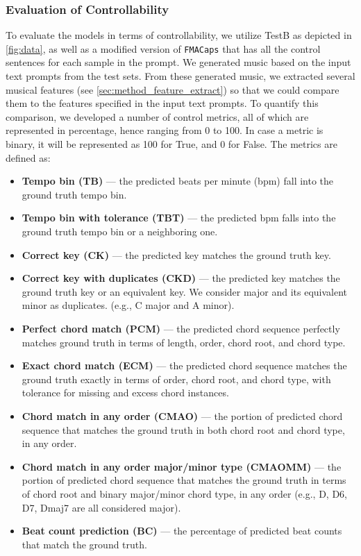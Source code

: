 \documentclass[11pt]{article}
\newcommand{\datasetFMA}{\texttt{FMACaps}}
\begin{document}
\subsubsection{Evaluation of Controllability}
\label{sec:ctrl_eval}
To evaluate the models in terms of controllability, we utilize TestB as depicted in \cref{fig:data}, as well as a modified version of \datasetFMA{} that has all the control sentences for each sample in the prompt. We generated music based on the input text prompts from the test sets. From these generated music, we extracted several musical features (see \cref{sec:method_feature_extract}) so that we could compare them to the features specified in the input text prompts. To quantify this comparison, we developed a number of control metrics, all of which are represented in percentage, hence ranging from 0 to 100. In case a metric is binary, it will be represented as 100 for True, and 0 for False. The metrics are defined as: \begin{itemize}[itemsep=0pt, leftmargin=*, wide, labelwidth=0pt, labelindent=0pt, parsep=0pt]
    \item \textbf{Tempo bin (TB)} --- the predicted beats per minute (bpm) fall into the ground truth tempo bin.
    \item \textbf{Tempo bin with tolerance (TBT)} --- the predicted bpm falls into the ground truth tempo bin or a neighboring one.
    \item \textbf{Correct key (CK)} --- the predicted key matches the ground truth key. 
    \item \textbf{Correct key with duplicates (CKD)} --- the predicted key matches the ground truth key or an equivalent key. We consider major and its equivalent minor as duplicates.  (e.g., C major and A minor). 
    \item \textbf{Perfect chord match (PCM)} --- the predicted chord sequence perfectly matches ground truth in terms of length, order, chord root, and chord type. 
    \item \textbf{Exact chord match (ECM)} --- the predicted chord sequence matches the ground truth exactly in terms of order, chord root, and chord type, with tolerance for missing and excess chord instances. 
    \item \textbf{Chord match in any order (CMAO)} --- the portion of predicted chord sequence that matches the ground truth in both chord root and chord type, in any order. 
    \item \textbf{Chord match in any order major/minor type (CMAOMM)} --- the portion of predicted chord sequence that matches the ground truth in terms of chord root and binary major/minor chord type, in any order (e.g., D, D6, D7, Dmaj7 are all considered major). 
    \item \textbf{Beat count prediction (BC)} --- the percentage of predicted beat counts that match the ground truth. 
\end{itemize}
\end{document}
